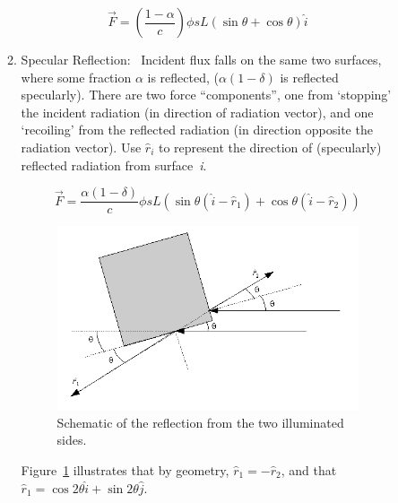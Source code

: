 \begin{description}
\begin{enumerate}
\begin{enumerate}
           \begin{equation}
             \vec {F} = \left( \frac {1-\alpha}{c} \right)
             \phi s L (\sin \theta + \cos \theta) \hat {i}
           \end{equation}
          \item{Specular Reflection:}\ \newline
            Incident flux falls on the same two surfaces, where some fraction
            $\alpha $ is reflected, ($\alpha(1-\delta)$ is reflected
            specularly).  There are two force ``components'', one from
            `stopping' the incident radiation (in direction of radiation
            vector), and one `recoiling' from the reflected radiation (in
            direction opposite the radiation vector).  Use $\hat{r}_{i}$ to
            represent the direction of (specularly) reflected radiation from
            surface~\textit{i}.

            \begin{equation*}
            \vec {F}=\frac{\alpha (1-\delta)}{c} \phi sL \left(\sin \theta
            (\hat{i}-\hat{r}_{1})+\cos \theta (\hat{i}-\hat{r}_{2})\right)
            \end{equation*}


            \begin{figure}[!ht]
            \begin{center}
              \includegraphics[width=100mm]{figs/isoth_app/iso_app_figs5.jpg}
              \caption{Schematic of the reflection from the two illuminated
                 sides.}
              \label{fig:ivv_isotherm_fig5}
            \end{center}
            \end{figure}

Figure~\ref{fig:ivv_isotherm_fig5} illustrates that by geometry,
            $\hat {r}_{1} = - \hat {r}_{2}$, and that
            $\hat {r}_{1} = \cos 2\theta \hat {i} + \sin 2 \theta \hat {j}$.


\end{enumerate}
\end{enumerate}
\end{description}
